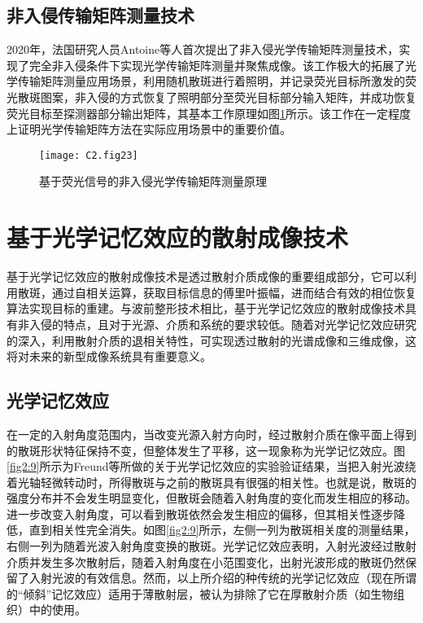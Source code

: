 \subsection{非入侵传输矩阵测量技术}

2020年，法国研究人员Antoine等\cite{boniface_non_invasive_2020}人首次提出了非入侵光学传输矩阵测量技术，实现了完全非入侵条件下实现光学传输矩阵测量并聚焦成像。该工作极大的拓展了光学传输矩阵测量应用场景，利用随机散斑进行着照明，并记录荧光目标所激发的荧光散斑图案，非入侵的方式恢复了照明部分至荧光目标部分输入矩阵，并成功恢复荧光目标至探测器部分输出矩阵，其基本工作原理如图\ref{fig2:23}所示。该工作在一定程度上证明光学传输矩阵方法在实际应用场景中的重要价值。

\begin{figure}[htp]
	\centering
	\texttt{[image: C2.fig23]}
	\caption{基于荧光信号的非入侵光学传输矩阵测量原理\cite{boniface_non_invasive_2020}}
	\label{fig2:23}
\end{figure}


\section{基于光学记忆效应的散射成像技术}

基于光学记忆效应的散射成像技术是透过散射介质成像的重要组成部分，它可以利用散斑，通过自相关运算，获取目标信息的傅里叶振幅，进而结合有效的相位恢复算法实现目标的重建。与波前整形技术相比，基于光学记忆效应的散射成像技术具有非入侵的特点，且对于光源、介质和系统的要求较低。随着对光学记忆效应研究的深入，利用散射介质的退相关特性，可实现透过散射的光谱成像\cite{park_multispectral_2013,stewart_toward_2017}和三维成像\cite{Pegard2016,holekamp_fast_2008}，这将对未来的新型成像系统具有重要意义。

\subsection{光学记忆效应}

在一定的入射角度范围内，当改变光源入射方向时，经过散射介质在像平面上得到的散斑形状特征保持不变，但整体发生了平移，这一现象称为光学记忆效应。图\ref{fig2:9}所示为Freund等\cite{Freund1988}所做的关于光学记忆效应的实验验证结果，当把入射光波绕着光轴轻微转动时，所得散斑与之前的散斑具有很强的相关性。也就是说，散斑的强度分布并不会发生明显变化，但散斑会随着入射角度的变化而发生相应的移动。进一步改变入射角度，可以看到散斑依然会发生相应的偏移，但其相关性逐步降低，直到相关性完全消失。如图\ref{fig2:9}所示，左侧一列为散斑相关度的测量结果，右侧一列为随着光波入射角度变换的散斑。光学记忆效应表明，入射光波经过散射介质并发生多次散射后，随着入射角度在小范围变化，出射光波形成的散斑仍然保留了入射光波的有效信息。然而，以上所介绍的种传统的光学记忆效应（现在所谓的“倾斜”记忆效应）适用于薄散射层，被认为排除了它在厚散射介质（如生物组织）中的使用。

